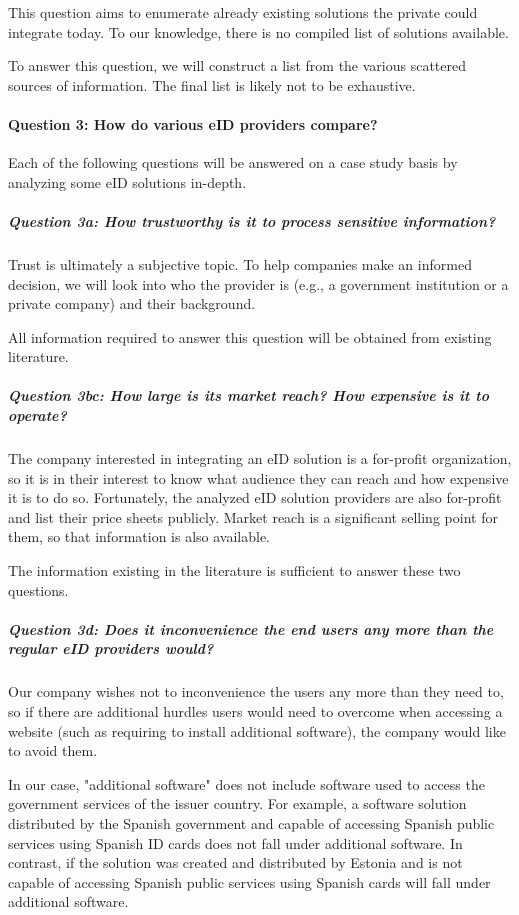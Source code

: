 This question aims to enumerate already existing solutions the private could integrate today. To our knowledge, there is no compiled list of solutions available.

To answer this question, we will construct a list from the various scattered sources of information. The final list is likely not to be exhaustive.

\paragraph{Question 3: How do various eID providers compare?}\noindent

Each of the following questions will be answered on a case study basis by analyzing some eID solutions in-depth.

\subparagraph{Question 3a: How trustworthy is it to process sensitive information?}\noindent

Trust is ultimately a subjective topic. To help companies make an informed decision, we will look into who the provider is (e.g., a government institution or a private company) and their background.

All information required to answer this question will be obtained from existing literature.

\subparagraph{Question 3bc: How large is its market reach? How expensive is it to operate?}\noindent

The company interested in integrating an eID solution is a for-profit organization, so it is in their interest to know what audience they can reach and how expensive it is to do so. Fortunately, the analyzed eID solution providers are also for-profit and list their price sheets publicly. Market reach is a significant selling point for them, so that information is also available.

The information existing in the literature is sufficient to answer these two questions.

\subparagraph{Question 3d: Does it inconvenience the end users any more than the regular eID providers would?}\noindent

Our company wishes not to inconvenience the users any more than they need to, so if there are additional hurdles users would need to overcome when accessing a website (such as requiring to install additional software), the company would like to avoid them.

In our case, "additional software" does not include software used to access the government services of the issuer country. For example, a software solution distributed by the Spanish government and capable of accessing Spanish public services using Spanish ID cards does not fall under additional software. In contrast, if the solution was created and distributed by Estonia and is not capable of accessing Spanish public services using Spanish cards will fall under additional software.

